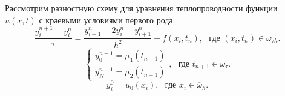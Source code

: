 \documentclass[11pt,a4paper,twoside]{report}
\numberwithin{equation}{section}
\theoremstyle{definition}
\theoremstyle{plain}
\begin{document}
Рассмотрим разностную схему для уравнения теплопроводности функции $u(x,t)$ с
краевыми условиями первого рода:
%
\begin{equation}
%
    \label{diskr_temp_equ_2}
    \frac{y_i^{n+1} - y_i^n}{\tau} = \frac{y_{i-1}^{n} - 2y_i^n + y_{i+1}^n}{h^2}
    + f(x_i,t_n),~~~\mbox{где $(x_i, t_n)\in \omega_{\tau h}$.}
%
\end{equation}
%
%
\begin{equation}
%
    \label{bord_diskr_2}
    \begin{cases}
            y_0^{n+1} = \mu_1(t_{n+1}) \\
            y_N^{n+1} = \mu_2(t_{n+1})
        \end{cases}
        ,~~~\mbox{где $t_{n+1}\in \overline{\omega}_{\tau}$.}
%
\end{equation}
%
%
\begin{equation}
%
    \label{start_diskr_2}
    y_i^0 = u_0(x_i),~~~\mbox{где $x_i\in \overline{\omega}_h$.}
%
\end{equation}
%
\fi %
\end{document}
